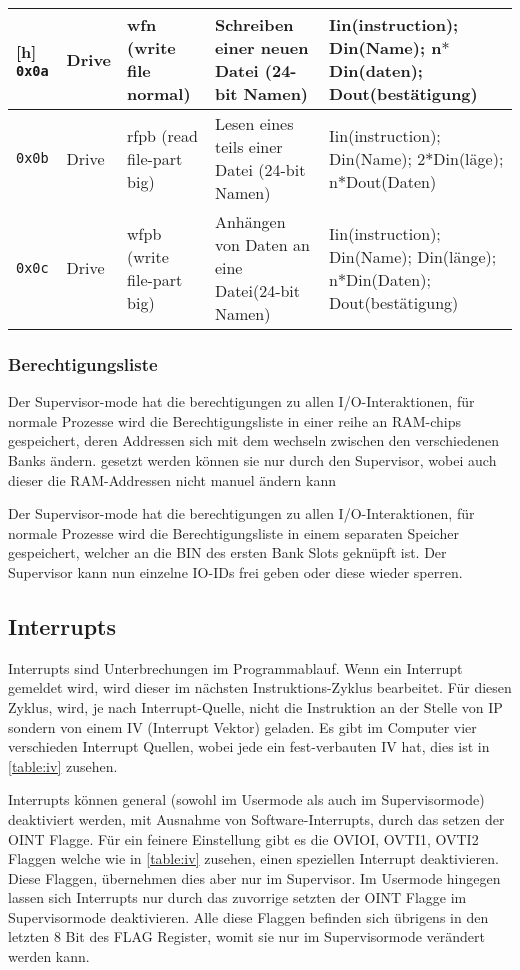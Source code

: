 \documentclass{scrartcl}
\begin{document}
\begin{center}
\begin{longtable}{p{} | p{} | p{} | p{} | p{}}[h]
			\hline
			\texttt{0x0a} & Drive & wfn (write file normal) & Schreiben einer neuen Datei (24-bit Namen) & Iin(instruction); Din(Name); n$*$Din(daten); Dout(bestätigung) \\
			\hline
			\texttt{0x0b} & Drive & rfpb (read file-part big) & Lesen eines teils einer Datei (24-bit Namen) & Iin(instruction); Din(Name); 2$*$Din(läge); n$*$Dout(Daten) \\
			\hline
			\texttt{0x0c} & Drive & wfpb (write file-part big) & Anhängen von Daten an eine Datei(24-bit Namen) & Iin(instruction); Din(Name); Din(länge); n$*$Din(Daten); Dout(bestätigung)
	\end{longtable}
\end{center}


\subsubsection{\label{section:persmissionIO}Berechtigungsliste}

Der Supervisor-mode hat die berechtigungen zu allen I/O-Interaktionen, für normale Prozesse wird die Berechtigungsliste in einer reihe an RAM-chips gespeichert, deren Addressen sich mit dem wechseln zwischen den verschiedenen Banks ändern.
gesetzt werden können sie nur durch den Supervisor, wobei auch dieser die RAM-Addressen nicht manuel ändern kann 

Der Supervisor-mode hat die berechtigungen zu allen I/O-Interaktionen, für normale Prozesse wird die Berechtigungsliste in einem separaten Speicher gespeichert, welcher an die BIN des ersten Bank Slots geknüpft ist. Der Supervisor kann nun einzelne IO-IDs frei geben oder diese wieder sperren.


\subsection{\label{section:interrupts}Interrupts}

Interrupts sind Unterbrechungen im Programmablauf. Wenn ein Interrupt gemeldet wird, wird dieser im nächsten Instruktions-Zyklus bearbeitet. Für diesen Zyklus, wird, je nach Interrupt-Quelle, nicht die Instruktion an der Stelle von IP sondern von einem IV (Interrupt Vektor) geladen. Es gibt im Computer vier verschieden Interrupt Quellen, wobei jede ein fest-verbauten IV hat, dies ist in \autoref{table:iv} zusehen.

Interrupts können general (sowohl im Usermode als auch im Supervisormode) deaktiviert werden, mit Ausnahme von Software-Interrupts, durch das setzen der OINT Flagge. Für ein feinere Einstellung gibt es die OVIOI, OVTI1, OVTI2 Flaggen welche wie in \autoref{table:iv} zusehen, einen speziellen Interrupt deaktivieren. Diese Flaggen, übernehmen dies aber nur im Supervisor. Im Usermode hingegen lassen sich Interrupts nur durch das zuvorrige setzten der OINT Flagge im Supervisormode deaktivieren. Alle diese Flaggen befinden sich übrigens in den letzten 8 Bit des FLAG Register, womit sie nur im Supervisormode verändert werden kann.
\end{document}

